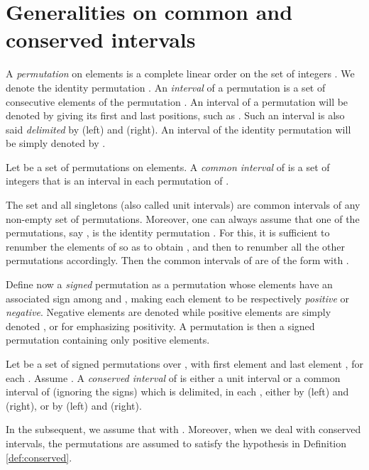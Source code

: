 \documentclass{article}
\begin{document}
\section{Generalities on common and conserved intervals}\label{sect:Generalities}
A {\em permutation}  on  elements is a complete linear order on the set
of integers . We denote  the identity
permutation . An {\em interval} of a permutation
 is a set of consecutive elements of the
permutation . An interval of a permutation will be denoted 
by  giving its first and last positions, such as . Such
an interval is also said {\it delimited} by  (left) and  (right).
An interval  of the identity permutation 
will be simply denoted by .

\begin{definition}
  \label{def:common-intervals}
  Let  be a set of  permutations
  on  elements.
  A {\em common interval} of   
  is a set of integers that 
  is an interval in each permutation of  .
\end{definition}

The set  and all singletons (also called unit
intervals) are common intervals of any non-empty set  of
permutations.  Moreover, one can always assume that one of the permutations,
say , is the identity permutation . For this, it is sufficient
to renumber the elements of  so as to obtain , and then 
to renumber all the other permutations accordingly. Then the common
intervals of  are of the form  with .

Define now a {\it signed} permutation as a permutation  whose elements have an associated sign among
  and , making each element to be respectively {\em positive} or {\em negative}.  
Negative elements are denoted  while positive elements are simply denoted , or  for emphasizing positivity. A permutation is then a signed permutation containing only  positive elements. 

\begin{definition}[\citet{BS06}]
Let    be 
a set of signed permutations over , with first element  and last element , 
for each . Assume .
A {\em conserved interval} of  is either a unit interval or a common interval  of 
(ignoring the signs) which is delimited, in each , either by  (left) and  (right),
or by    (left) and  (right).
\label{def:conserved}
\end{definition}

\begin{remark}
In the subsequent, we assume that    with . Moreover,
when we deal with conserved intervals, the permutations are assumed to satisfy the hypothesis in
Definition \ref{def:conserved}. 
\end{remark}
\end{document}
